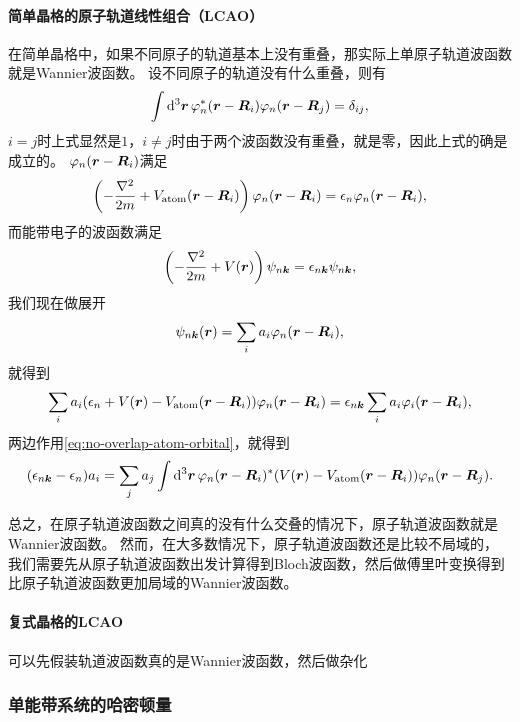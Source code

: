 \paragraph{简单晶格的原子轨道线性组合（LCAO）} 在简单晶格中，如果不同原子的轨道基本上没有重叠，那实际上单原子轨道波函数就是Wannier波函数。
设不同原子的轨道没有什么重叠，则有
\begin{equation}
    \int \dd[3]{\vb*{r}} \varphi_n^*(\vb*{r} - \vb*{R}_i) \varphi_n(\vb*{r} - \vb*{R}_j) = \delta_{ij},
    \label{eq:no-overlap-atom-orbital}
\end{equation}
$i=j$时上式显然是$1$，$i \neq j$时由于两个波函数没有重叠，就是零，因此上式的确是成立的。
$\varphi_n(\vb*{r} - \vb*{R}_i)$满足
\begin{equation}
    \left( - \frac{\laplacian}{2m} + V_\text{atom} (\vb*{r} - \vb*{R}_i) \right) \varphi_n(\vb*{r} - \vb*{R}_i) = \epsilon_n \varphi_n(\vb*{r} - \vb*{R}_i),
\end{equation}
而能带电子的波函数满足
\begin{equation}
    \left( - \frac{\laplacian}{2m} + V (\vb*{r}) \right) \psi_{n \vb*{k}} = \epsilon_{n \vb*{k}} \psi_{n \vb*{k}},
\end{equation}
我们现在做展开
\begin{equation}
    \psi_{n \vb*{k}}(\vb*{r}) = \sum_i a_i \varphi_n(\vb*{r} - \vb*{R}_i),
\end{equation}
就得到
\[
    \sum_i a_i (\epsilon_n + V(\vb*{r}) - V_\text{atom}(\vb*{r} - \vb*{R}_i)) \varphi_n(\vb*{r} - \vb*{R}_i) = \epsilon_{n \vb*{k}} \sum_i a_i \varphi_i(\vb*{r} - \vb*{R}_i),
\]
两边作用\eqref{eq:no-overlap-atom-orbital}，就得到
\begin{equation}
    (\epsilon_{n \vb*{k}} - \epsilon_n) a_i = \sum_{j} a_j \int \dd[3]{\vb*{r}} \varphi_n(\vb*{r} - \vb*{R}_i)^* ( V(\vb*{r}) - V_\text{atom}(\vb*{r} - \vb*{R}_i)) \varphi_n(\vb*{r} - \vb*{R}_j).
\end{equation}

总之，在原子轨道波函数之间真的没有什么交叠的情况下，原子轨道波函数就是Wannier波函数。
然而，在大多数情况下，原子轨道波函数还是比较不局域的，我们需要先从原子轨道波函数出发计算得到Bloch波函数，然后做傅里叶变换得到比原子轨道波函数更加局域的Wannier波函数。

\paragraph{复式晶格的LCAO} 可以先假装轨道波函数真的是Wannier波函数，然后做杂化

\subsubsection{单能带系统的哈密顿量}

